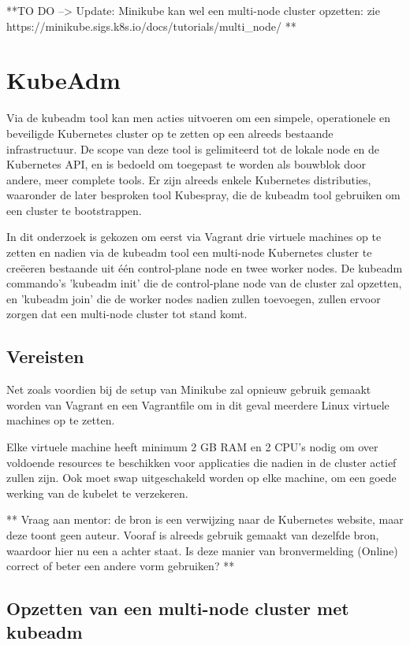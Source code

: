 **TO DO --> Update: Minikube kan wel een multi-node cluster opzetten: zie https://minikube.sigs.k8s.io/docs/tutorials/multi_node/ **

\section{KubeAdm}

Via de kubeadm tool kan men acties uitvoeren om een simpele, operationele en beveiligde Kubernetes cluster op te zetten op een alreeds bestaande infrastructuur. De scope van deze tool is gelimiteerd tot de lokale node en de Kubernetes API, en is bedoeld om toegepast te worden als bouwblok door andere, meer complete tools. \autocite{Kubeadm2021}
Er zijn alreeds enkele Kubernetes distributies, waaronder de later besproken tool Kubespray, die de kubeadm tool gebruiken om een cluster te bootstrappen.     

In dit onderzoek is gekozen om eerst via Vagrant drie virtuele machines op te zetten  en nadien via de kubeadm tool een multi-node Kubernetes cluster te creëeren bestaande uit één control-plane node en twee worker nodes. De kubeadm commando's 'kubeadm init' die de control-plane node van de cluster zal opzetten, en 'kubeadm join' die de worker nodes nadien zullen toevoegen, zullen ervoor zorgen dat een multi-node cluster tot stand komt.

\subsection{Vereisten}

Net zoals voordien bij de setup van Minikube zal opnieuw gebruik gemaakt worden van Vagrant en een Vagrantfile om in dit geval meerdere Linux virtuele machines op te zetten.

Elke virtuele machine heeft minimum 2 GB RAM en 2 CPU's nodig om over voldoende resources te beschikken voor applicaties die nadien in de cluster actief zullen zijn. Ook moet swap uitgeschakeld worden op elke machine, om een goede werking van de kubelet te verzekeren. \autocite{Kubernetes2022a}

** Vraag aan mentor: de bron is een verwijzing naar de Kubernetes website, maar deze toont geen auteur. Vooraf is alreeds gebruik gemaakt van dezelfde bron, waardoor hier nu een a achter staat. Is deze manier van bronvermelding (Online) correct of beter een andere vorm gebruiken? ** 

\subsection{Opzetten van een multi-node cluster met kubeadm}

